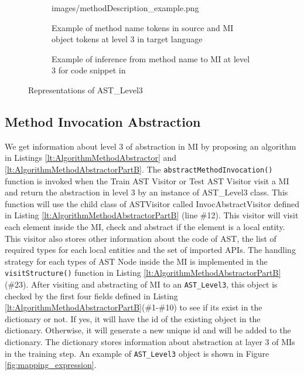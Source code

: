 \begin{figure}
\begin{subfigure}[t]{0.23\textwidth}
{        {images/methodDescription_example.png}}
        \caption{Example of method name tokens in source and MI object tokens at level 3 in target language}
        \label{fig:method_desc_example}
      \end{subfigure}
      \hfill
      \begin{subfigure}{0.3\textwidth}
        \caption{\label{fig:example_in} Example of inference from method name to MI at level 3 for code snippet in \cite{id:IntrinsicAndroidExample}}
      \end{subfigure}
\caption{
\label{fig:CombineImageOfASTLevel3}%
Representations of AST\_Level3}
\end{figure}

\subsection{Method Invocation Abstraction}

We get information about level 3 of abstraction in MI by proposing an algorithm in Listings \ref{lt:AlgorithmMethodAbstractor} and \ref{lt:AlgorithmMethodAbstractorPartB}. The \texttt{abstractMethodInvocation()} function is invoked when the Train AST Visitor or Test AST Visitor visit a MI and return the abstraction in level 3 by an instance of AST\_Level3 class. This function will use the child class of ASTVisitor called InvocAbstractVisitor defined in Listing \ref{lt:AlgorithmMethodAbstractorPartB} (line \#12). This visitor will visit each element inside the MI, check and abstract if the element is a local entity. This visitor also stores other information about the code of AST, the list of required types for each local entities and the set of imported APIs. The handling strategy for each types of AST Node inside the MI is implemented in the \texttt{visitStructure()} function in  Listing \ref{lt:AlgorithmMethodAbstractorPartB}(\#23). After visiting and abstracting of MI to an \texttt{AST\_Level3}, this object is checked by the first four fields defined in Listing \ref{lt:AlgorithmMethodAbstractorPartB}(\#1-\#10)  to see if its exist in the dictionary or not. If yes, it will have the id of the existing object in the dictionary. Otherwise, it will generate a new unique id and will be added to the dictionary. The dictionary stores information about abstraction at layer 3 of MIs in the training step. An example of  \texttt{AST\_Level3} object is shown in Figure \ref{fig:mapping_expression}.


